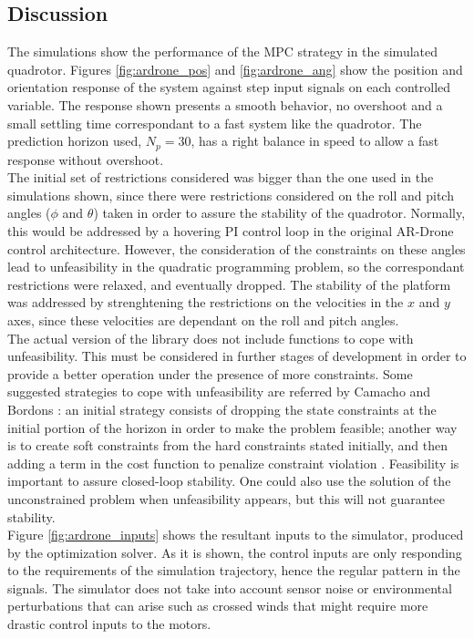 \subsection{Discussion}

The simulations show the performance of the MPC strategy in the simulated quadrotor. Figures \ref{fig:ardrone_pos} and \ref{fig:ardrone_ang} show the position and orientation  response of the system against step input signals on each controlled variable. The response shown presents a smooth behavior, no overshoot and a small settling time correspondant to a fast system like the quadrotor. The prediction horizon used, $N_p = 30$, has a right balance in speed to allow a fast response without overshoot.\\

The initial set of restrictions considered was bigger than the one used in the simulations shown, since there were restrictions considered on the roll and pitch angles ($\phi$ and $\theta$) taken in order to assure the stability of the quadrotor. Normally, this would be addressed by a hovering PI control loop in the original AR-Drone control architecture. However, the consideration of the constraints on these angles lead to unfeasibility in the quadratic programming problem, so  the correspondant restrictions were relaxed, and eventually dropped. The stability of the platform was addressed by strenghtening the restrictions on the velocities in the $x$ and $y$ axes, since these velocities are dependant on the roll and pitch angles. \\

The actual version of the library does not include functions to cope with unfeasibility. This must be considered in further stages of development in order to provide a better operation under the presence of more constraints. Some suggested strategies to cope with unfeasibility are referred by Camacho and Bordons \cite{CamachoBordons}: an initial strategy consists of dropping the state constraints at the initial portion of the horizon in order to make the problem feasible; another way is to create soft constraints from the hard constraints stated initially, and then adding a term in the cost function to penalize constraint violation \cite{Molero2011}. Feasibility is important to assure closed-loop stability. One could also use the solution of the unconstrained problem  when unfeasibility appears, but this will not guarantee stability. \\

Figure \ref{fig:ardrone_inputs} shows the resultant inputs to the simulator, produced by the optimization solver. As it is shown, the control inputs are only responding to the requirements of the simulation trajectory, hence the regular pattern in the signals. The simulator does not take into account sensor noise or environmental perturbations that can arise such as crossed winds that might require more drastic control inputs to the motors.  \\

